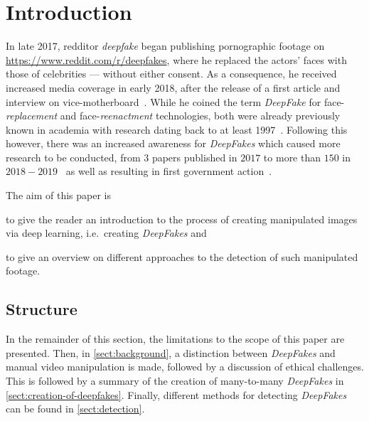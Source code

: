 \section{Introduction}
In late 2017, \gls{redditor} \textit{deepfake} began publishing pornographic footage
on \url{https://www.reddit.com/r/deepfakes}, where he replaced the actors' faces
with those of celebrities --- without either consent. As a consequence, he
received increased media coverage in early 2018, after the release of a first 
article and interview on vice-motherboard~\cite{Cole.2017}. While he coined the
term \textit{DeepFake} for face-\textit{replacement} and face-\textit{reenactment}
technologies, both were already previously known in academia with research 
dating back to at least 1997~\cite{Bregler.1997}.
Following this however, there was an increased awareness for \textit{DeepFakes}
which caused more research to be conducted, from \(3\) papers published in
\(2017\) to more than \(150\) in \(2018-2019\)~\cite{mirsky_creation_2020} as
well as resulting in first government action~\cite{senate_-_homeland_security_and_governmental_affairs_deepfake_2019}.

\par
The aim of this paper is
\begin{enumerate*}[a.)]
    \item to give the reader an introduction to the process of creating manipulated
    images via deep learning, i.e.\ creating \textit{DeepFakes} and
    \item to give an overview on different approaches to the detection of such
    manipulated footage.
\end{enumerate*}

\subsection{Structure}
In the remainder of this section, the limitations to the scope of this paper are
presented. Then, in \cref{sect:background}, a distinction between \textit{DeepFakes}
and manual video manipulation is made, followed by a discussion of ethical challenges.
This is followed by a summary of the creation of many-to-many \textit{DeepFakes}
in \cref{sect:creation-of-deepfakes}. Finally, different methods for detecting
\textit{DeepFakes} can be found in \cref{sect:detection}.

